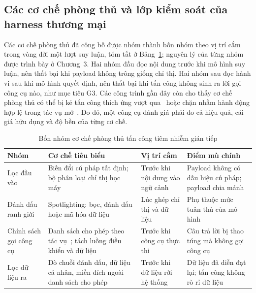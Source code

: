 \documentclass[../DoAn.tex]{subfiles}
\begin{document}
\subsection{Các cơ chế phòng thủ và lớp kiểm soát của harness thương mại}
\label{subsection:2.1.4}

Các cơ chế phòng thủ đã công bố được nhóm thành bốn nhóm theo vị trí cắm trong vòng đời một lượt suy luận, tóm tắt ở Bảng~\ref{tab:phongthu}; nguyên lý của từng nhóm được trình bày ở Chương~3. Hai nhóm đầu đọc nội dung trước khi mô hình suy luận, nên thất bại khi payload không trông giống chỉ thị. Hai nhóm sau đọc hành vi sau khi mô hình quyết định, nên thất bại khi tấn công không sinh ra lời gọi công cụ nào, như mục tiêu G3. Các công trình gần đây còn cho thấy cơ chế phòng thủ có thể bị kẻ tấn công thích ứng vượt qua~\cite{zhan2025adaptive,ma2026autodojo} hoặc chặn nhầm hành động hợp lệ trong tác vụ mở~\cite{li2026agentdyn}. Do đó, một công cụ đánh giá phải đo cả hiệu quả, cái giá hữu dụng và độ bền của từng cơ chế.

\begin{table}[htbp]
	\centering
	\caption{Bốn nhóm cơ chế phòng thủ tấn công tiêm nhiễm gián tiếp}
	\label{tab:phongthu}
	\setlength{\tabcolsep}{3pt}
\begin{tabular}{|p{}|p{}|p{}|p{}|}
		\hline
		\textbf{Nhóm} & \textbf{Cơ chế tiêu biểu} & \textbf{Vị trí cắm} & \textbf{Điểm mù chính} \\ \hline
		Lọc đầu vào & Biến đổi cú pháp tất định; bộ phân loại chỉ thị học máy~\cite{promptguard} & Trước khi nội dung vào ngữ cảnh & Payload không có dấu hiệu cú pháp; payload chia mảnh \\ \hline
		Đánh dấu ranh giới & Spotlighting: bọc, đánh dấu hoặc mã hóa dữ liệu~\cite{hines2024spotlighting} & Lúc ghép chỉ thị và dữ liệu & Phụ thuộc mức tuân thủ của mô hình \\ \hline
		Chính sách gọi công cụ & Danh sách cho phép theo tác vụ~\cite{debenedetti2024agentdojo}; tách luồng điều khiển và dữ liệu~\cite{debenedetti2025camel} & Trước khi công cụ thực thi & Câu trả lời bị thao túng mà không gọi công cụ \\ \hline
		Lọc dữ liệu ra & Dò chuỗi đánh dấu, dữ liệu cá nhân, miền đích ngoài danh sách cho phép & Trước khi dữ liệu rời hệ thống & Dữ liệu đã diễn đạt lại; tấn công không rò rỉ dữ liệu \\ \hline
	\end{tabular}
\end{table}
\end{document}
